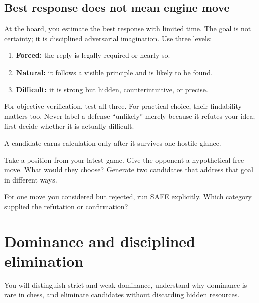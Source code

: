 \section{Best response does not mean engine move}
At the board, you estimate the best response with limited time. The goal is not certainty; it is disciplined adversarial imagination. Use three levels:

\begin{enumerate}[label=\arabic*.,leftmargin=1.4em]
\item \textbf{Forced:} the reply is legally required or nearly so.
\item \textbf{Natural:} it follows a visible principle and is likely to be found.
\item \textbf{Difficult:} it is strong but hidden, counterintuitive, or precise.
\end{enumerate}

For objective verification, test all three. For practical choice, their findability matters too. Never label a defense ``unlikely'' merely because it refutes your idea; first decide whether it is actually difficult.

\begin{memorybox}
A candidate earns calculation only after it survives one hostile glance.
\end{memorybox}

\begin{exercise}
Take a position from your latest game. Give the opponent a hypothetical free move. What would they choose? Generate two candidates that address that goal in different ways.
\end{exercise}

\begin{exercise}
For one move you considered but rejected, run SAFE explicitly. Which category supplied the refutation or confirmation?
\end{exercise}


\chapter{Dominance and disciplined elimination}
\begin{learningbox}
You will distinguish strict and weak dominance, understand why dominance is rare in chess, and eliminate candidates without discarding hidden resources.
\end{learningbox}

